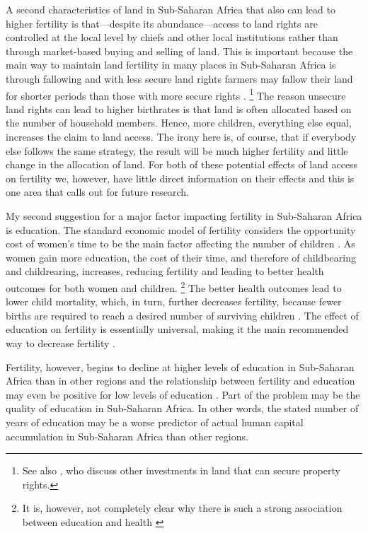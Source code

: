 \documentclass[letterpaper,12pt]{article}
\begin{document}
A second characteristics of land in Sub-Saharan Africa that also can
lead to higher fertility is that---despite its abundance---access to
land rights are controlled at the local level by chiefs and other local
institutions rather than through market-based buying and selling of
land.
This is important because the main way to maintain land fertility in
many places in Sub-Saharan Africa is through fallowing and with less
secure land rights farmers may fallow their land for shorter periods
than those with more secure rights \citep{Goldstein2008}.%
\footnote{
See also \citet{besley95c}, who discuss other investments in land that
can secure property rights.}
The reason unsecure land rights can lead to higher birthrates is that
land is often allocated based on the number of household members.
Hence, more children, everything else equal, increases the claim to land
access.
The irony here is, of course, that if everybody else follows the same
strategy, the result will be much higher fertility and little change in
the allocation of land.
For both of these potential effects of land access on fertility we,
however, have little direct information on their effects and this is one
area that calls out for future research.

My second suggestion for a major factor impacting fertility in
Sub-Saharan Africa is education.
The standard economic model of fertility considers the opportunity cost
of women's time to be the main factor affecting the number of children
\citep{becker91}.
As women gain more education, the cost of their time, and therefore of
childbearing and childrearing, increases, reducing fertility and leading
to better health outcomes for both women and children.%
\footnote{
It is, however, not completely clear why there is such a strong
association between education and health
\citep{Thomas1991,Glewwe1999,Kovsted2002}} The better health outcomes
lead to lower child mortality, which, in turn, further decreases
fertility, because fewer births are required to reach a desired number
of surviving children \citep{Ainsworth1996}.
The effect of education on fertility is essentially universal, making it
the main recommended way to decrease fertility \citep{schultz02}.

Fertility, however, begins to decline at higher levels of education in
Sub-Saharan Africa than in other regions and the relationship between
fertility and education may even be positive for low levels of education
\citep{Ainsworth1996,Benefo1996,Thomas1996}.
Part of the problem may be the quality of education in Sub-Saharan
Africa.
In other words, the stated number of years of education may be a worse
predictor of actual human capital accumulation in Sub-Saharan Africa
than other regions.
\end{document}
